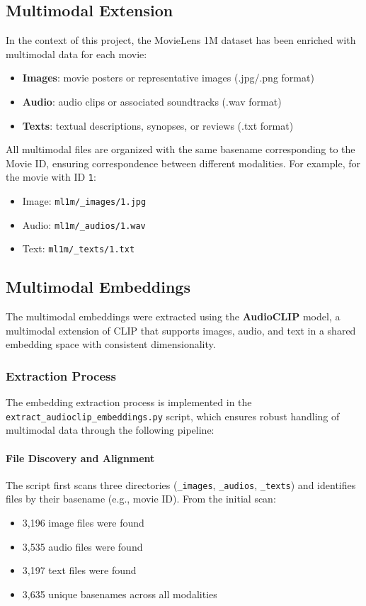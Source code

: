 \subsection{Multimodal Extension}

In the context of this project, the MovieLens 1M dataset has been enriched with multimodal data for each movie:

\begin{itemize}
    \item \textbf{Images}: movie posters or representative images (.jpg/.png format)
    \item \textbf{Audio}: audio clips or associated soundtracks (.wav format)
    \item \textbf{Texts}: textual descriptions, synopses, or reviews (.txt format)
\end{itemize}

All multimodal files are organized with the same basename corresponding to the Movie ID, ensuring correspondence between different modalities. For example, for the movie with ID \texttt{1}:
\begin{itemize}
    \item Image: \texttt{ml1m/\_images/1.jpg}
    \item Audio: \texttt{ml1m/\_audios/1.wav}
    \item Text: \texttt{ml1m/\_texts/1.txt}
\end{itemize}

\subsection{Multimodal Embeddings}

The multimodal embeddings were extracted using the \textbf{AudioCLIP} model, a multimodal extension of CLIP that supports images, audio, and text in a shared embedding space with consistent dimensionality.

\subsubsection{Extraction Process}

The embedding extraction process is implemented in the \texttt{extract\_audioclip\_embeddings.py} script, which ensures robust handling of multimodal data through the following pipeline:

\paragraph{File Discovery and Alignment}
The script first scans three directories (\texttt{\_images}, \texttt{\_audios}, \texttt{\_texts}) and identifies files by their basename (e.g., movie ID). From the initial scan:
\begin{itemize}
    \item 3,196 image files were found
    \item 3,535 audio files were found
    \item 3,197 text files were found
    \item 3,635 unique basenames across all modalities
\end{itemize}

